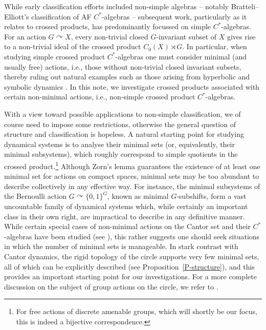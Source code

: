 \documentclass[11pt,a4paper,leqno]{amsart}
\theoremstyle{definition}
\theoremstyle{remark}
\numberwithin{equation}{section}
\theoremstyle{plain}
\begin{document}
While early classification efforts included non-simple algebras -- notably Bratteli--Elliott’s classification of AF $C^*$-algebras \cite{Bra72,Ell76} -- subsequent work, particularly as it relates to crossed products, has predominantly focussed on simple $C^*$-algebras. For an action $G\curvearrowright X$, every non-trivial closed $G$-invariant subset of $X$ gives rise to a non-trivial ideal of the crossed product $C_0(X) \rtimes G$. In particular, when studying simple crossed product $C^*$-algebras one must consider minimal (and usually free) actions, i.e., those without non-trivial closed invariant subsets, thereby ruling out natural examples such as those arising from hyperbolic and symbolic dynamics \cite{Nek22}. In this note, we investigate crossed products associated with certain non-minimal actions, i.e., non-simple crossed product $C^*$-algebras.

With a view toward possible applications to non-simple classification, we of course need to impose some restrictions, otherwise the general question of structure and classification is hopeless. A natural starting point for studying dynamical systems is to analyse their minimal sets (or, equivalently, their minimal subsystems), which roughly correspond to simple quotients in the crossed product.\footnote{For free actions of discrete amenable groups, which will shortly be our focus, this is indeed a bijective correspondence.} Although Zorn's lemma guarantees the existence of at least one minimal set for actions on compact spaces, minimal sets may be too abundant to describe collectively in any effective way. For instance, the minimal subsystems of the Bernoulli action $G\curvearrowright \{0,1\}^G$, known as minimal $G$-subshifts, form a vast uncountable family of dynamical systems which, while certainly an important class in their own right, are impractical to describe in any definitive manner. While certain special cases of non-minimal actions on the Cantor set and their $C^*$-algebras have been studied (see \cite{BezNiuSun21}), this rather suggests one should seek situations in which the number of minimal sets is manageable. In stark contrast with Cantor dynamics, the rigid topology of the circle supports very few minimal sets, all of which can be explicitly described (see Proposition~\ref{P-structure}), and this provides an important starting point for our investigations. For a more complete discussion on the subject of group actions on the circle, we refer to \cite{Ghy01,Nav11}.  
\end{document}
